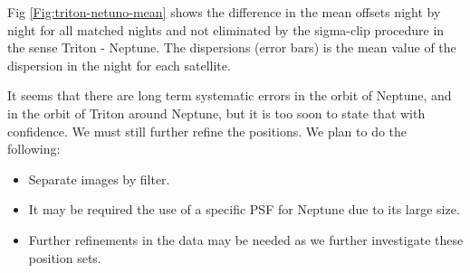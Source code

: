\documentclass[12pt,a4paper]{report}
\newcommand{\PE}{Perkin-Elmer }
\newcommand{\BC}{Boller \& Chivens }
\begin{document}
Fig \ref{Fig:triton-netuno-mean} shows the difference in the mean offsets night by night for all matched nights and not eliminated by the sigma-clip procedure in the sense Triton - Neptune. The dispersions (error bars) is the mean value of the dispersion in the night for each satellite.



It seems that there are long term systematic errors in the orbit of Neptune, and in the orbit of Triton around Neptune, but it is too soon to state that with confidence. We must still further refine the positions. We plan to do the following:

\begin{itemize}
\item Separate images by filter.
\item It may be required the use of a specific PSF for Neptune due to its large size.
\item Further refinements in the data may be needed as we further investigate these position sets.
\end{itemize}


\end{document}
